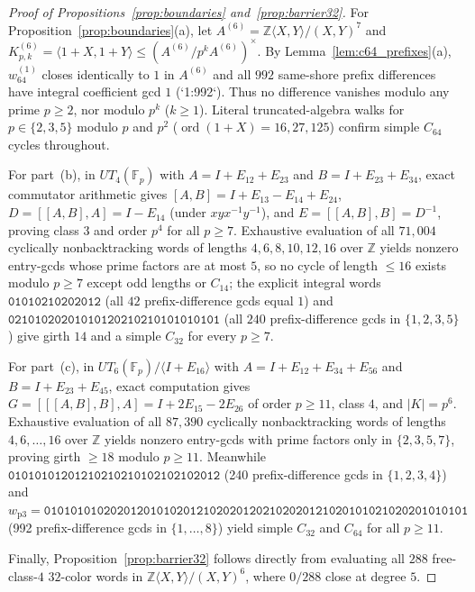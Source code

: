 \documentclass[11pt]{amsart}
\theoremstyle{definition}
\theoremstyle{remark}
\newcommand{\F}{\mathbb{F}}
\newcommand{\Z}{\mathbb{Z}}
\newcommand{\ord}{\operatorname{ord}}
\begin{document}
\begin{proof}[Proof of Propositions~\ref{prop:boundaries} and~\ref{prop:barrier32}]
For Proposition~\ref{prop:boundaries}(a), let $A^{(6)} = \Z\langle X,Y\rangle/(X,Y)^7$ and $K_{p,k}^{(6)} = \langle 1+X, 1+Y \rangle \le (A^{(6)}/p^k A^{(6)})^\times$. By Lemma~\ref{lem:c64_prefixes}(a), $w_{64}^{(1)}$ closes identically to $1$ in $A^{(6)}$ and all $992$ same-shore prefix differences have integral coefficient gcd $1$ (`1:992`). Thus no difference vanishes modulo any prime $p \ge 2$, nor modulo $p^k$ ($k \ge 1$). Literal truncated-algebra walks for $p \in \{2,3,5\}$ modulo $p$ and $p^2$ ($\ord(1+X) = 16, 27, 125$) confirm simple $C_{64}$ cycles throughout.

For part~(b), in $UT_4(\F_p)$ with $A = I + E_{12} + E_{23}$ and $B = I + E_{23} + E_{34}$, exact commutator arithmetic gives $[A,B] = I + E_{13} - E_{14} + E_{24}$, $D = [[A,B], A] = I - E_{14}$ (under $xyx^{-1}y^{-1}$), and $E = [[A,B], B] = D^{-1}$, proving class $3$ and order $p^4$ for all $p \ge 7$. Exhaustive evaluation of all $71{,}004$ cyclically nonbacktracking words of lengths $4, 6, 8, 10, 12, 16$ over $\Z$ yields nonzero entry-gcds whose prime factors are at most $5$, so no cycle of length $\le 16$ exists modulo $p \ge 7$ except odd lengths or $C_{14}$; the explicit integral words $\mathtt{01010210202012}$ (all $42$ prefix-difference gcds equal $1$) and $\mathtt{02101020201010120210210101010101}$ (all $240$ prefix-difference gcds in $\{1,2,3,5\}$) give girth $14$ and a simple $C_{32}$ for every $p \ge 7$.

For part~(c), in $UT_6(\F_p)/\langle I + E_{16}\rangle$ with $A = I + E_{12} + E_{34} + E_{56}$ and $B = I + E_{23} + E_{45}$, exact computation gives $G = [[[A,B],B], A] = I + 2 E_{15} - 2 E_{26}$ of order $p \ge 11$, class $4$, and $|K| = p^6$. Exhaustive evaluation of all $87{,}390$ cyclically nonbacktracking words of lengths $4, 6, \dots, 16$ over $\Z$ yields nonzero entry-gcds with prime factors only in $\{2,3,5,7\}$, proving girth $\ge 18$ modulo $p \ge 11$. Meanwhile $\mathtt{01010101201210210210102102102012}$ (240 prefix-difference gcds in $\{1,2,3,4\}$) and $w_{\mathrm{p3}} = \mathtt{0101010102020120101020121020201202102020121020101021020201010101}$ (992 prefix-difference gcds in $\{1,\dots,8\}$) yield simple $C_{32}$ and $C_{64}$ for all $p \ge 11$.

Finally, Proposition~\ref{prop:barrier32} follows directly from evaluating all $288$ free-class-$4$ $32$-color words in $\Z\langle X,Y\rangle/(X,Y)^6$, where $0/288$ close at degree $5$.
\end{proof}
\end{document}

